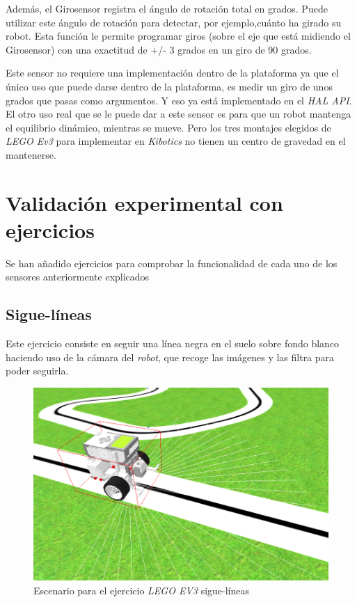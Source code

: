 Además, el Girosensor registra el ángulo de rotación total en grados. Puede utilizar este ángulo de rotación para detectar, por ejemplo,cuánto ha girado su robot. Esta función le permite programar giros (sobre el eje que está midiendo el Girosensor) con una exactitud de +/- 3 grados en un giro de 90 grados.

Este sensor no requiere una implementación dentro de la plataforma ya que el único uso que puede darse dentro de la plataforma, es medir un giro de unos grados que pasas como argumentos. Y eso ya está implementado en el \textit{HAL API}. El otro uso real que se le puede dar a este sensor es para que un robot mantenga el equilibrio dinámico, mientras se mueve. Pero los tres montajes elegidos de \textit{LEGO Ev3} para implementar en \textit{Kibotics} no tienen un centro de gravedad en el mantenerse.

  
\section{Validación experimental con ejercicios}
\label{sec:ejercicios}

Se han añadido ejercicios para comprobar la funcionalidad de cada uno de los sensores anteriormente explicados 

\subsection{Sigue-líneas}
    Este ejercicio consiste en seguir una línea negra en el suelo sobre fondo blanco haciendo uso de la cámara del \textit{robot}, que recoge las imágenes y las filtra para poder seguirla.
    
    
    \begin{figure}[H]
    \centering
    \includegraphics[scale=0.4]{img/siguelineas.png}
    \caption{Escenario para el ejercicio \textit{LEGO EV3} sigue-líneas} \label{fig:siguelinea}
    \end{figure}
    
